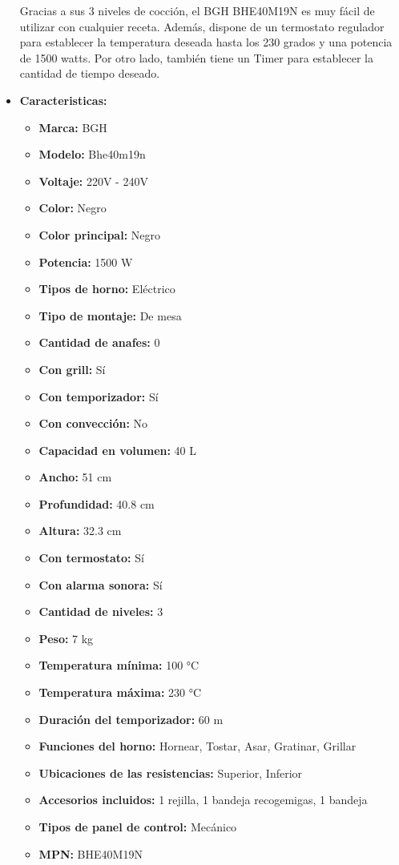 \documentclass{article}
\begin{document}
\begin{adjustwidth}{2em}{}
\begin{itemize}
Gracias a sus 3 niveles de cocción, el BGH BHE40M19N es muy fácil de utilizar con cualquier receta. Además, dispone de un termostato regulador para establecer la temperatura deseada hasta los 230 grados y una potencia de 1500 watts. Por otro lado, también tiene un Timer para establecer la cantidad de tiempo deseado.
        \item \textbf{Caracteristicas:} 
        \begin{itemize}
            \item \textbf {Marca:} BGH
    \item \textbf {Modelo:} Bhe40m19n
    \item \textbf {Voltaje:} 220V - 240V
    \item \textbf {Color:} Negro
    \item \textbf {Color principal:} Negro
    \item \textbf {Potencia:} 1500 W
    \item \textbf {Tipos de horno:} Eléctrico
    \item \textbf {Tipo de montaje:} De mesa
    \item \textbf {Cantidad de anafes:} 0
    \item \textbf {Con grill:} Sí
    \item \textbf {Con temporizador:} Sí
    \item \textbf {Con convección:} No
    \item \textbf {Capacidad en volumen:} 40 L
    \item \textbf {Ancho:} 51 cm
    \item \textbf {Profundidad:} 40.8 cm
    \item \textbf {Altura:} 32.3 cm
    \item \textbf {Con termostato:} Sí
    \item \textbf {Con alarma sonora:} Sí
    \item \textbf {Cantidad de niveles:} 3
    \item \textbf {Peso:} 7 kg
    \item \textbf {Temperatura mínima:} 100 °C
    \item \textbf {Temperatura máxima:} 230 °C
    \item \textbf {Duración del temporizador:} 60 m
    \item \textbf {Funciones del horno:} Hornear, Tostar, Asar, Gratinar, Grillar
    \item \textbf {Ubicaciones de las resistencias:} Superior, Inferior
    \item \textbf {Accesorios incluidos:} 1 rejilla, 1 bandeja recogemigas, 1 bandeja
    \item \textbf {Tipos de panel de control:} Mecánico
    \item \textbf {MPN:} BHE40M19N
        \end{itemize}
    \end{itemize}

    \vspace{1\baselineskip} %
    \end{adjustwidth}
\end{document}
